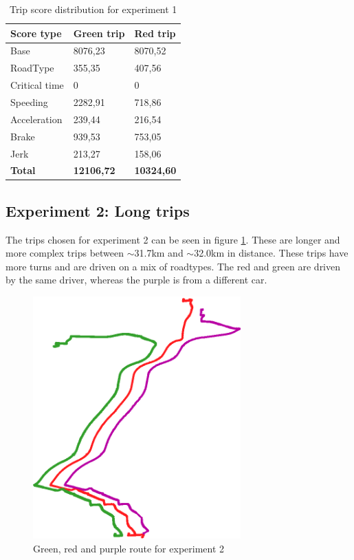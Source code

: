 \begin{table}
    \centering
    \begin{tabular}{lll}
    \textbf{Score type} & \textbf{Green trip} & \textbf{Red trip} \\ \hline
    Base                & 8076,23             & 8070,52           \\
    RoadType            & 355,35              & 407,56            \\
    Critical time       & 0                   & 0                 \\
    Speeding            & 2282,91             & 718,86            \\
    Acceleration        & 239,44              & 216,54            \\
    Brake               & 939,53              & 753,05            \\
    Jerk                & 213,27              & 158,06            \\ \hline
    \textbf{Total}      & \textbf{12106,72}   & \textbf{10324,60} \\ \hline
    \end{tabular}
    \caption{Trip score distribution for experiment 1}
    \label{tab:shorttripscores}
\end{table}

\subsection{Experiment 2: Long trips} \label{subsec:expe2}
The trips chosen for experiment 2 can be seen in figure \ref{fig:longtrips}. These are longer and more complex trips between $\sim$31.7km and $\sim$32.0km in distance. These trips have more turns and are driven on a mix of roadtypes. The red and green are driven by the same driver, whereas the purple is from a different car.

\begin{figure}[tb]
    \centering
    \includegraphics[width=80mm]{Pictures/LongTrips.png}
    \caption{Green, red and purple route for experiment 2}
    \label{fig:longtrips}
\end{figure}

